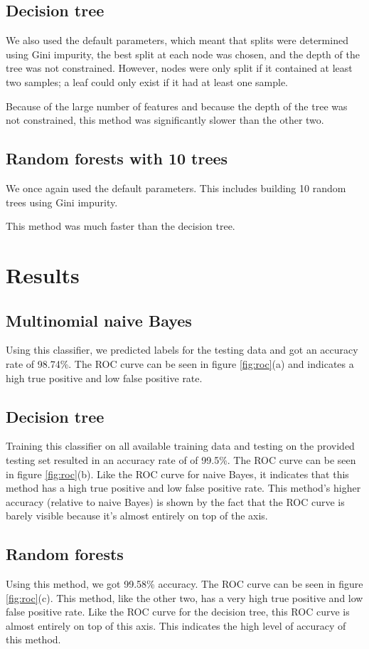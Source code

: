 \documentclass{article} %
\begin{document}
\subsection{Decision tree}
We also used the default parameters, which meant that splits were determined using Gini impurity, the best split at each node was chosen, and the depth of the tree was not constrained. However, nodes were only split if it contained at least two samples; a leaf could only exist if it had at least one sample. 

Because of the large number of features and because the depth of the tree was not constrained, this method was significantly slower than the other two.
\subsection{Random forests with 10 trees}
We once again used the default parameters. This includes building 10 random trees using Gini impurity.

This method was much faster than the decision tree.

\section{Results}
\subsection{Multinomial naive Bayes}
Using this classifier, we predicted labels for the testing data and got an accuracy rate of 98.74\%. The ROC curve can be seen in figure \ref{fig:roc}(a) and indicates a high true positive and low false positive rate.

\subsection{Decision tree}
Training this classifier on all available training data and testing on the provided testing set resulted in an accuracy rate of of 99.5\%. The ROC curve can be seen in figure \ref{fig:roc}(b). Like the ROC curve for naive Bayes, it indicates that this method has a high true positive and low false positive rate. This method's higher accuracy (relative to naive Bayes) is shown by the fact that the ROC curve is barely visible because it's almost entirely on top of the axis.

\subsection{Random forests}
Using this method, we got 99.58\% accuracy. The ROC curve can be seen in figure \ref{fig:roc}(c). This method, like the other two, has a very high true positive and low false positive rate. Like the ROC curve for the decision tree, this ROC curve is almost entirely on top of this axis. This indicates the high level of accuracy of this method. 
\end{document}

